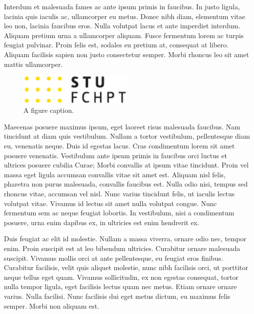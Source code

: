 Interdum et malesuada fames ac ante ipsum primis in faucibus. In justo ligula, 
lacinia quis iaculis ac, ullamcorper eu metus. Donec nibh diam, elementum vitae 
leo non, lacinia faucibus eros. Nulla volutpat lacus et ante imperdiet 
interdum. Aliquam pretium urna a ullamcorper aliquam. Fusce fermentum lorem ac 
turpis feugiat pulvinar. Proin felis est, sodales eu pretium at, consequat at 
libero. Aliquam facilisis sapien non justo consectetur semper. Morbi rhoncus 
leo sit amet mattis ullamcorper.

\begin{figure}
	\centering
	\includegraphics[width = 0.5\textwidth]{images/fchpt_logo_color}
	\caption{A figure caption.}
	\label{fig:label}
\end{figure}

Maecenas posuere maximus ipsum, eget laoreet risus malesuada faucibus. Nam 
tincidunt at diam quis vestibulum. Nullam a tortor vestibulum, pellentesque 
diam eu, venenatis neque. Duis id egestas lacus. Cras condimentum lorem sit 
amet posuere venenatis. Vestibulum ante ipsum primis in faucibus orci luctus et 
ultrices posuere cubilia Curae; Morbi convallis at ipsum vitae tincidunt. Proin 
vel massa eget ligula accumsan convallis vitae sit amet est. Aliquam nisl 
felis, pharetra non purus malesuada, convallis faucibus est. Nulla odio nisi, 
tempus sed rhoncus vitae, accumsan vel nisl. Nunc varius tincidunt felis, ut 
iaculis lectus volutpat vitae. Vivamus id lectus sit amet nulla volutpat 
congue. Nunc fermentum sem ac neque feugiat lobortis. In vestibulum, nisi a 
condimentum posuere, urna enim dapibus ex, in ultricies est enim hendrerit ex.

Duis feugiat ac elit id molestie. Nullam a massa viverra, ornare odio nec, 
tempor enim. Proin suscipit est at leo bibendum ultricies. Curabitur ornare 
malesuada suscipit. Vivamus mollis orci at ante pellentesque, eu feugiat eros 
finibus. Curabitur facilisis, velit quis aliquet molestie, nunc nibh facilisis 
orci, ut porttitor neque tellus eget quam. Vivamus sollicitudin, ex non egestas 
consequat, tortor nulla tempor ligula, eget facilisis lectus quam nec metus. 
Etiam ornare ornare varius. Nulla facilisi. Nunc facilisis dui eget metus 
dictum, eu maximus felis semper. Morbi non aliquam est.